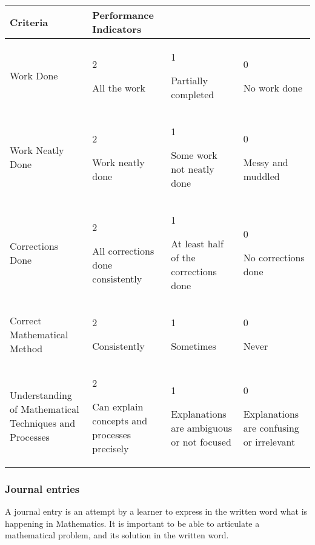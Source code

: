 \begin{table}[H]
 \begin{center}
  \begin{tabular}{|p{3cm}|p{3cm}|p{3cm}|p{3cm}|} \hline
   \textbf{Criteria} & \textbf{Performance Indicators} &&\\ \hline
Work Done & 2 \par All the work & 1 \par Partially completed & 0 \par No work done \\ \hline
Work Neatly Done & 2 \par Work neatly done & 1 \par Some work not neatly done & 0 \par Messy and muddled\\ \hline
Corrections Done & 2 \par All corrections done consistently & 1 \par At least half of the corrections done & 0 \par No corrections done \\ \hline
Correct Mathematical Method & 2 \par Consistently & 1 \par Sometimes & 0 \par Never \\ \hline
Understanding of Mathematical Techniques and Processes & 2 \par Can explain concepts and processes precisely & 1 \par Explanations are ambiguous or not focused & 0 \par Explanations are confusing or irrelevant \\ \hline
  \end{tabular}

 \end{center}

\end{table}

\subsubsection{Journal entries}
A journal entry is an attempt by a learner to express in the written word what is happening in Mathematics. It is important to be able to articulate a mathematical problem, and its solution in the written word. \par

